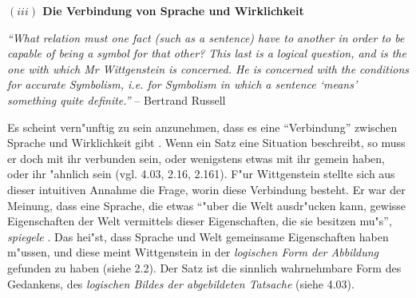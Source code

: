 \documentclass[a4paper, emulatestandardclasses, 12pt]{scrartcl}
\begin{document}
\begin{onehalfspace}
\vspace{5mm}
\noindent\textbf{$(iii)$ Die Verbindung von Sprache und Wirklichkeit}	
\vspace{3mm}
\begin{addmargin}[.065\linewidth]{.065\linewidth}%
\footnotesize

\noindent \emph{"`What relation must one fact (such as a sentence) have to another in order to be capable of being a symbol for that other? This last is a logical question, and is the one with which Mr Wittgenstein is concerned. He is concerned with the conditions for accurate Symbolism, i.e. for Symbolism in which a sentence `means' something quite definite."'} -- Bertrand Russell \cite[S. 7]{wittgenstein1922tractatus}

\end{addmargin}
\normalsize
\vspace{3mm}

Es scheint vern"unftig zu sein anzunehmen, dass es eine "`Verbindung"' zwischen Sprache und Wirklichkeit gibt \cite[vgl.][S. 1 f.]{emiliani1999formsp}. Wenn ein Satz eine Situation beschreibt, so muss er doch mit ihr verbunden sein, oder wenigstens etwas mit ihr gemein haben, oder ihr "ahnlich sein (vgl. 4.03, 2.16, 2.161). F"ur Wittgenstein stellte sich aus dieser intuitiven Annahme die Frage, worin diese Verbindung besteht. Er war der Meinung, dass eine Sprache, die etwas "`"uber die Welt ausdr"ucken kann, gewisse Eigenschaften der Welt vermittels dieser Eigenschaften, die sie besitzen mu"s"', \emph{spiegele} \cite[siehe][S. 209]{wittgenstein1963tractatus}. Das hei"st, dass Sprache und Welt gemeinsame Eigenschaften haben m"ussen, und diese meint Wittgenstein in der \emph{logischen Form der Abbildung} gefunden zu haben (siehe 2.2). Der Satz ist die sinnlich wahrnehmbare Form des Gedankens, des \emph{logischen Bildes der abgebildeten Tatsache} (siehe 4.03).


\end{onehalfspace}
\end{document}
